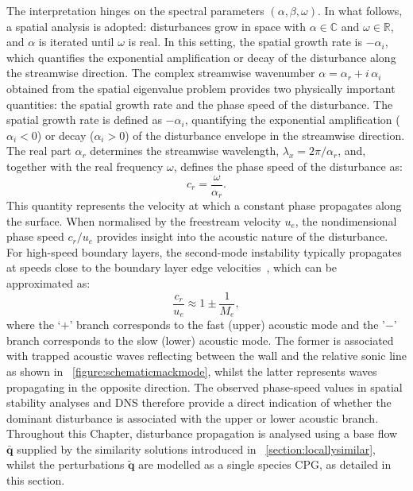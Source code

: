 The interpretation hinges on the spectral parameters $(\alpha,\beta,\omega)$. In what follows, a spatial analysis is adopted: disturbances grow in space with $\alpha \in \mathbb{C}$ and $\omega \in \mathbb{R}$, and $\alpha$ is iterated until $\omega$ is real. In this setting, the spatial growth rate is $-\alpha_i$, which quantifies the exponential amplification or decay of the disturbance along the streamwise direction. The complex streamwise wavenumber $\alpha = \alpha_r + i\,\alpha_i$ obtained from the spatial eigenvalue problem provides two physically important quantities: the spatial growth rate and the phase speed of the disturbance. The spatial growth rate is defined as $-\alpha_i$, quantifying the exponential amplification ($\alpha_i < 0$) or decay ($\alpha_i > 0$) of the disturbance envelope in the streamwise direction. The real part $\alpha_r$ determines the streamwise wavelength, $\lambda_x = 2\pi / \alpha_r$, and, together with the real frequency $\omega$, defines the phase speed of the disturbance as:
\begin{equation}
  c_r = \frac{\omega}{\alpha_r}.
\end{equation}
This quantity represents the velocity at which a constant phase propagates along the surface. When normalised by the freestream velocity $u_e$, the nondimensional phase speed $c_r/u_e$ provides insight into the acoustic nature of the disturbance. For high-speed boundary layers, the second-mode instability typically propagates at speeds close to the boundary layer edge velocities~\citep{Fedorov2011}, which can be approximated as: %
\begin{equation} 
  \frac{c_r}{u_e} \approx 1 \pm \frac{1}{M_e},
\end{equation}
where the `$+$' branch corresponds to the fast (upper) acoustic mode and the '$-$' branch corresponds to the slow (lower) acoustic mode. The former is associated with trapped acoustic waves reflecting between the wall and the relative sonic line as shown in ~\cref{figure:schematicmackmode}, whilst the latter represents waves propagating in the opposite direction. The observed phase-speed values in spatial stability analyses and \gls{DNS} therefore provide a direct indication of whether the dominant disturbance is associated with the upper or lower acoustic branch. Throughout this Chapter, disturbance propagation is analysed using a base flow $\bar{\boldsymbol{q}}$ supplied by the similarity solutions introduced in ~\cref{section:locallysimilar}, whilst the perturbations $\tilde{\boldsymbol{q}}$ are modelled as a single species \gls{CPG}, as detailed in this section.


